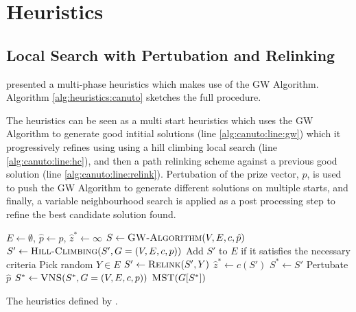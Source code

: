 \section{Heuristics}\label{sec:solving:heuristics}

\subsection{Local Search with Pertubation and Relinking}\label{sec:canuto-search}

\cite{canuto2001local} presented a multi-phase heuristics which makes use of the GW Algorithm.
 Algorithm \ref{alg:heuristics:canuto} sketches the full procedure. 

 The heuristics can be seen as a multi start heuristics which uses the GW Algorithm
 to generate good intitial
 solutions (line \ref{alg:canuto:line:gw})
 which it progressively refines using using a hill climbing local search
 (line \ref{alg:canuto:line:hc}),
 and then a path relinking scheme against a previous good solution
 (line \ref{alg:canuto:line:relink}).
 Pertubation of the prize vector, $p$, is used to push the GW Algorithm to generate
 different solutions on multiple starts, and finally, a
 variable neighbourhood search is applied as a
 post processing step to refine the best candidate solution found.

 \begin{algorithm}[h!]
   \begin{algorithmic}[1]
     \State $E \gets \emptyset$, $\hat{p} \gets p$, $\hat{z}^* \gets \infty$
     \State $S \gets \Call{GW-Algorithm}{V,E, c, \hat{p}}$ \label{alg:canuto:line:gw}
     \State $S' \gets \Call{Hill-Climbing}{S', G = (V, E, c, p)}$ \label{alg:canuto:line:hc}
     \State Add $S'$ to $E$ if it satisfies the necessary criteria \label{alg:canuto:line:elite}
     \State Pick random $Y \in E$
     \State $S' \gets \Call{Relink}{S', Y}$ \label{alg:canuto:line:relink}
     \State $\hat{z}^* \gets c(S')$
     \State $S^* \gets S'$
     \EndIf
     \EndIf
     \State Pertubate $\hat{p}$
     \EndFor
     \State $S^* \gets \Call{VNS}{S^*, G = (V, E, c, p)}$\label{alg:canuto:line:vns}
     \State \Return $\Call{MST}{G[S^*]}$
     \EndProcedure
 \end{algorithmic}
 \caption{The heuristics defined by \cite{canuto2001local}.}\label{alg:heuristics:canuto}
 \end{algorithm}

